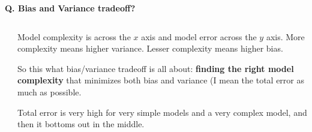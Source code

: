 \begin{frame}[fragile]{\textbf{Q. Bias and Variance tradeoff?}}
\begin{columns}[T]
\begin{column}{.58\textwidth}
{{      }
    }
  \end{column}
  \hfill
  \begin{column}{.4\textwidth}
    \footnotesize
    \begin{wideitemize}\footnotesize
    \item<1-> Model complexity is across the $x$ axis and model error across
    the $y$ axis. More complexity means higher variance. Lesser complexity
    means higher bias.
    \item<2-> So this what bias/variance tradeoff is all about: \textbf{finding
    the right model complexity} that minimizes both bias and variance (I mean
    the total error as much as possible.
    \item<3-> Total error is very high for very simple models and a very complex
    model, and then it bottoms out in the middle.
    \end{wideitemize}
    \end{column}
  \end{columns}
\end{frame}



